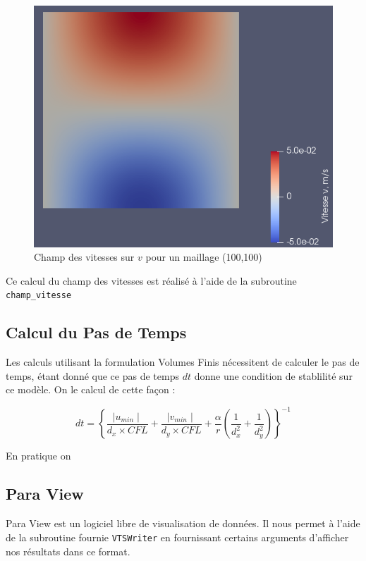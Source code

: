 \documentclass[a4paper,oneside]{article}
\begin{document}
\begin{figure}[h!]
	\centering
        \includegraphics[scale=0.4]{Champ_Vitesse_Maillage/Champ_Vitesse_v.png}
        \caption{Champ des vitesses sur $v$ pour un maillage (100,100)}
\end{figure}

Ce calcul du champ des vitesses est réalisé à l'aide de la subroutine \verb?champ_vitesse?

\subsection{Calcul du Pas de Temps}

Les calculs utilisant la formulation Volumes Finis nécessitent de calculer le pas de temps, étant donné que ce pas de temps $dt$ donne une condition de stablilité sur ce modèle. On le calcul de cette façon :

\[
	dt =  \left\{ \frac{\mid u_{min}\mid}{d_x \times CFL} +\frac{\mid v_{min}\mid}{d_y \times CFL} + \frac{\alpha}{r}\left(\frac{1}{d_x^2} + \frac{1}{d_y^2}\right) \right\}^{-1}
\]

En pratique on 
\subsection{Para View}

Para View est un logiciel libre de visualisation de données. 
Il nous permet à l'aide de la subroutine fournie \verb?VTSWriter? en fournissant certains arguments d'afficher nos résultats dans ce format.
\end{document}
